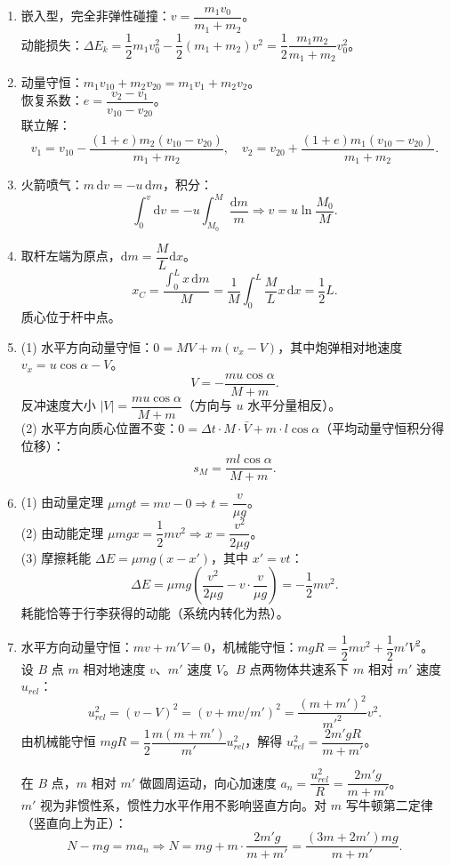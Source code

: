 \documentclass[12pt]{article}
\begin{document}
\begin{enumerate}[label=\textbf{例\arabic*.}, leftmargin=*]
\item 嵌入型，完全非弹性碰撞：$v = \dfrac{m_1 v_0}{m_1 + m_2}$。\\
动能损失：$\Delta E_k = \dfrac{1}{2}m_1 v_0^2 - \dfrac{1}{2}(m_1 + m_2)v^2 = \dfrac{1}{2}\dfrac{m_1 m_2}{m_1 + m_2}v_0^2$。

\item 动量守恒：$m_1 v_{10} + m_2 v_{20} = m_1 v_1 + m_2 v_2$。\\
恢复系数：$e = \dfrac{v_2 - v_1}{v_{10} - v_{20}}$。\\
联立解：
\[
  v_1 = v_{10} - \frac{(1 + e)m_2(v_{10} - v_{20})}{m_1 + m_2},\quad
  v_2 = v_{20} + \frac{(1 + e)m_1(v_{10} - v_{20})}{m_1 + m_2}.
\]

\item 火箭喷气：$m\,\mathrm{d}v = -u\,\mathrm{d}m$，积分：
\[
  \int_0^v \mathrm{d}v = -u\int_{M_0}^{M}\frac{\mathrm{d}m}{m} \Rightarrow v = u\ln\frac{M_0}{M}.
\]

\item 取杆左端为原点，$\mathrm{d}m = \dfrac{M}{L}\mathrm{d}x$。
\[
  x_C = \frac{\int_0^L x\,\mathrm{d}m}{M} = \frac{1}{M}\int_0^L \frac{M}{L}x\,\mathrm{d}x = \frac{1}{2}L.
\]
质心位于杆中点。

\item (1) 水平方向动量守恒：$0 = M V + m(v_x - V)$，其中炮弹相对地速度 $v_x = u\cos\alpha - V$。
\[
  V = -\frac{mu\cos\alpha}{M + m}.
\]
反冲速度大小 $|V| = \dfrac{mu\cos\alpha}{M + m}$（方向与 $u$ 水平分量相反）。\\
(2) 水平方向质心位置不变：$0 = \Delta t \cdot M \cdot \bar{V} + m \cdot l\cos\alpha$（平均动量守恒积分得位移）：
\[
  s_M = \frac{ml\cos\alpha}{M + m}.
\]

\item (1) 由动量定理 $\mu m g t = mv - 0 \Rightarrow t = \dfrac{v}{\mu g}$。\\
(2) 由动能定理 $\mu m g x = \dfrac{1}{2}mv^2 \Rightarrow x = \dfrac{v^2}{2\mu g}$。\\
(3) 摩擦耗能 $\Delta E = \mu m g (x - x')$，其中 $x' = vt$：
\[
  \Delta E = \mu m g\left(\frac{v^2}{2\mu g} - v \cdot \frac{v}{\mu g}\right) = -\frac{1}{2}mv^2.
\]
耗能恰等于行李获得的动能（系统内转化为热）。

\item 水平方向动量守恒：$mv + m'V = 0$，机械能守恒：$mgR = \dfrac{1}{2}mv^2 + \dfrac{1}{2}m'V^2$。
设 $B$ 点 $m$ 相对地速度 $v$、$m'$ 速度 $V$。$B$ 点两物体共速系下 $m$ 相对 $m'$ 速度 $u_{rel}$：
\[
  u_{rel}^2 = (v - V)^2 = (v + m v/m')^2 = \frac{(m + m')^2}{m'^2}v^2.
\]
由机械能守恒 $mgR = \dfrac{1}{2}\dfrac{m(m + m')}{m'}u_{rel}^2$，解得 $u_{rel}^2 = \dfrac{2m'gR}{m + m'}$。

在 $B$ 点，$m$ 相对 $m'$ 做圆周运动，向心加速度 $a_n = \dfrac{u_{rel}^2}{R} = \dfrac{2m'g}{m + m'}$。\\
$m'$ 视为非惯性系，惯性力水平作用不影响竖直方向。对 $m$ 写牛顿第二定律（竖直向上为正）：
\[
  N - mg = m a_n \Rightarrow N = mg + m \cdot \frac{2m'g}{m + m'} = \frac{(3m + 2m')mg}{m + m'}.
\]

\end{enumerate}
\end{document}

